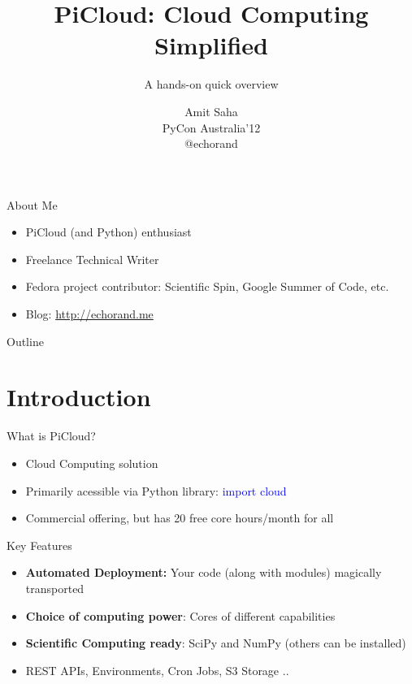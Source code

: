 \documentclass{beamer} \usepackage{fancyvrb} \usepackage{listings}
\title{PiCloud: Cloud Computing Simplified}
\subtitle{A hands-on quick overview}
\author{Amit Saha \\ PyCon Australia'12 \\ @echorand \\ }
\begin{document}
    \begin{frame}
      \titlepage
    \end{frame}

    \begin{frame}{About Me}
      \begin{itemize}
      \item PiCloud (and Python) enthusiast
      \item Freelance Technical Writer
      \item Fedora project contributor: Scientific Spin, Google Summer
        of Code, etc.
      \item Blog: \url{http://echorand.me}
      \end{itemize}
    \end{frame}

    \begin{frame}{Outline}
      \tableofcontents
    \end{frame}


    \section{Introduction}

    \begin{frame}{What is PiCloud?}
      \begin{itemize}
      \item Cloud Computing solution
      \item Primarily acessible via Python library:
        \textcolor{blue}{import cloud}
      \item Commercial offering, but has 20 free core hours/month for
        all
      \end{itemize}
    \end{frame}

    \begin{frame}{Key Features}
      \begin{itemize}
      \item \textbf{Automated Deployment:} Your code (along with
        modules) magically transported \pause
      \item \textbf{Choice of computing power}: Cores of different
        capabilities
      \item \textbf{Scientific Computing ready}: SciPy and NumPy
        (others can be installed)
      \item REST APIs, Environments, Cron Jobs, S3 Storage ..
      \end{itemize}
    \end{frame}
\end{document}
